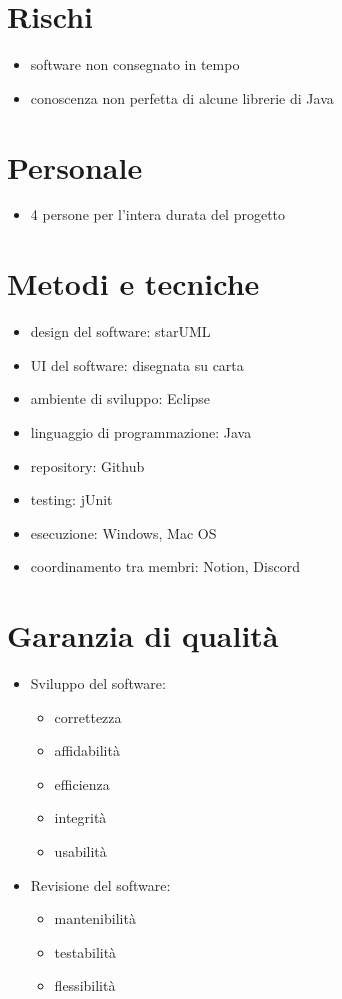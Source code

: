 \documentclass[12pt]{article}
\begin{document}
\section{Rischi}

\begin{itemize}
	\item software non consegnato in tempo
	\item conoscenza non perfetta di alcune librerie di Java
\end{itemize}

\section{Personale}
\begin{itemize}
        \item 4 persone per l'intera durata del progetto
\end{itemize}

\section{Metodi e tecniche}

\begin{itemize}
	\item design del software: starUML
	\item UI del software: disegnata su carta
	\item ambiente di sviluppo: Eclipse
	\item linguaggio di programmazione: Java
	\item repository: Github
	\item testing: jUnit
	\item esecuzione: Windows, Mac OS
	\item coordinamento tra membri: Notion, Discord
\end{itemize}

\section{Garanzia di qualità}
\begin{itemize}
	\item Sviluppo del software:
	\begin{itemize}
		\item correttezza
		\item affidabilità
		\item efficienza
		\item integrità
		\item usabilità
	\end{itemize}
	\item Revisione del software:
	\begin{itemize}
		\item mantenibilità
		\item testabilità
		\item flessibilità
	\end{itemize}
\end{itemize}
\end{document}
